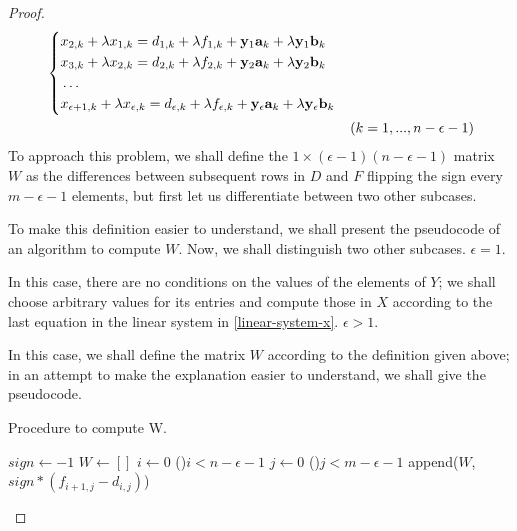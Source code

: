 \begin{cs}
\begin{proof}
\begin{equation}
            \begin{aligned}
            & \left\{
                \begin{aligned}
                    & x_{2, k} + \lambda x_{1, k} = d_{1, k} + \lambda f_{1, k} + \vb{y}_{1}\vb{a}_{k} +
                        \lambda \vb{y}_{1}\vb{b}_{k} \\
                    & x_{3, k} + \lambda x_{2, k} = d_{2, k} + \lambda f_{2, k} + \vb{y}_{2}\vb{a}_{k} +
                        \lambda \vb{y}_{2}\vb{b}_{k} \\
                    & \hdots \\
                    & x_{\epsilon+1, k} + \lambda x_{\epsilon, k} =
                        d_{\epsilon, k} + \lambda f_{\epsilon, k} + \vb{y}_{\epsilon}\vb{a}_{k} +
                        \lambda \vb{y}_{\epsilon}\vb{b}_{k} \\
                \end{aligned}
            \right. \\
            & & (k = 1, ..., n - \epsilon - 1)
        \end{aligned}
        \end{equation}
        To approach this problem, we shall define the \(1 \times (\epsilon - 1)(n - \epsilon - 1)\) matrix \(W\) as the differences between
        subsequent rows in \(D\) and \(F\) flipping the sign every \(m - \epsilon - 1\) elements, but first let us
        differentiate between two other subcases.
        
        To make this definition easier to understand, we shall present the pseudocode of an algorithm to compute \(W\).
        Now, we shall distinguish two other subcases.
        \subcase \(\epsilon = 1.\)

            In this case, there are no conditions on the values of the elements of \(Y\); we shall choose arbitrary values
            for its entries and compute those in \(X\) according to the last equation in the linear
            system in \eqref{linear-system-x}.
        \subcase \(\epsilon > 1.\)

        In this case, we shall define the matrix \(W\) according to the definition given above; in an attempt to make
        the explanation easier to understand, we shall give the pseudocode.

        \begin{algorithm*}
            \caption{Procedure to compute W.}
            $sign \gets -1$\;
            $W \gets []$\;
            $i \gets 0$\;
            \For(){$i < n - \epsilon - 1$}{
                $j \gets 0$\;
                \For(){$j < m - \epsilon - 1$}{
                    append($W$, $sign * (f_{i+1, j} - d_{i, j})$)\;
                }
            }
        \end{algorithm*}


\end{proof}
\end{cs}
